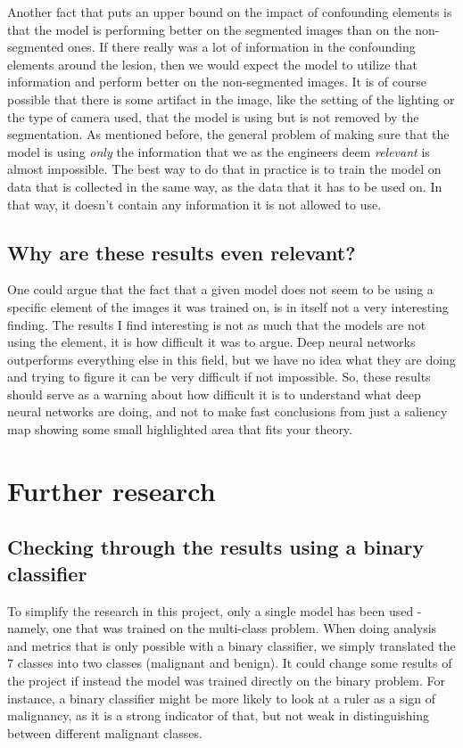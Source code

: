 Another fact that puts an upper bound on the impact of confounding elements is that the model
is performing better on the segmented images than on the non-segmented ones.
If there really was a lot of information in the confounding elements around the lesion,
then we would expect the model to utilize that information and perform better on the non-segmented images.
It is of course possible that there is some artifact in the image, like the setting of the lighting or the type of camera used,
that the model is using but is not removed by the segmentation.
As mentioned before, the general problem of making sure that the model is using \textit{only} the information that we as 
the engineers deem \textit{relevant} is almost impossible.
The best way to do that in practice is to train the model on data that is collected in the same way,
as the data that it has to be used on.
In that way, it doesn't contain any information it is not allowed to use.

\subsection{Why are these results even relevant?}
One could argue that the fact that a given model does not seem to be using a specific element of the images it was trained on, 
is in itself not a very interesting finding.
The results I find interesting is not as much that the models are not using the element,
it is how difficult it was to argue.
Deep neural networks outperforms everything else in this field,
but we have no idea what they are doing and trying to figure it can be very difficult if not impossible.
So, these results should serve as a warning about how difficult it is to understand what deep neural networks are doing,
and not to make fast conclusions from just a saliency map showing some small highlighted area that fits your theory.

\section{Further research}
\subsection{Checking through the results using a binary classifier}
To simplify the research in this project, only a single model has been used - namely, one that was trained on the multi-class problem.
When doing analysis and metrics that is only possible with a binary classifier,
we simply translated the $7$ classes into two classes (malignant and benign).
It could change some results of the project if instead the model was trained directly on the binary problem.
For instance, a binary classifier might be more likely to look at a ruler as a sign of malignancy,
as it is a strong indicator of that, but not weak in distinguishing between different malignant classes.

